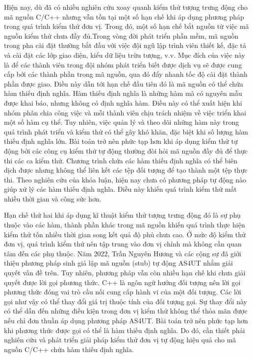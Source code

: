 Hiện nay, dù đã có nhiều nghiên cứu xoay quanh kiểm thử tượng trưng động cho mã nguồn C/C++ nhưng vẫn tồn tại một số hạn chế khi áp dụng phương pháp trong quá trình kiểm thử đơn vị. Trong đó, một số hạn chế bắt nguồn từ việc mã nguồn kiểm thử chưa đầy đủ.Trong vòng đời phát triển phần mềm, mã nguồn trong pha cài đặt thường bắt đầu với việc đội ngũ lập trình viên thiết kế, đặc tả và cài đặt các lớp giao diện, kiểu dữ liệu trừu tượng, v.v. Mục đích của việc này là để các thành viên trong đội nhóm phát triển biết được dịch vụ sẽ được cung cấp bởi các thành phần trong mã nguồn, qua đó đẩy nhanh tốc độ cài đặt thành phần được giao. Điều này dẫn tới hạn chế đầu tiên đó là mã nguồn có thể chứa hàm thiếu định nghĩa. Hàm thiếu định nghĩa là những hàm mà có nguyên mẫu được khai báo, nhưng không có định nghĩa hàm. Điều này có thể xuất hiện khi nhóm phân chia công việc và mỗi thành viên chịu trách nhiệm về việc triển khai một số hàm cụ thể. Tuy nhiên, việc quản lý và theo dõi những hàm này trong quá trình phát triển và kiểm thử có thể gây khó khăn, đặc biệt khi số lượng hàm thiếu định nghĩa lớn. Bài toán trở nên phức tạp hơn khi áp dụng kiểm thử tự động bởi các công cụ kiểm thử tự động thường đòi hỏi mã nguồn đầy đủ để thực thi các ca kiểm thử. Chương trình chứa các hàm thiếu định nghĩa có thể biên dịch được nhưng không thể liên kết các tệp đối tượng để tạo thành một tệp thực thi. Theo nghiên cứu của khóa luận, hiện nay chưa có phương pháp tự động nào giúp xử lý các hàm thiếu định nghĩa. Điều này khiến quá trình kiểm thử mất nhiều thời gian và công sức hơn. 

Hạn chế thứ hai khi áp dụng kĩ thuật kiểm thử tượng trưng động đó là sự phụ thuộc vào các hàm, thành phần khác trong mã nguồn khiến quá trình thực hiện kiểm thử tốn nhiều thời gian song kết quả độ phủ chưa cao. Ở mức độ kiểm thử đơn vị, quá trình kiểm thử nên tập trung vào đơn vị chính mà không cần quan tâm đến các phụ thuộc. Năm 2022, Trần Nguyên Hương và các cộng sự đã giới thiệu phương pháp sinh giả lập mã nguồn (stub) tự động AS4UT \cite{TUNG2022106821} nhằm giải quyết vấn đề trên. Tuy nhiên, phương pháp vẫn còn nhiều hạn chế khi chưa giải quyết được lời gọi phương thức. C++ là ngôn ngữ hướng đối tượng nên lời gọi phương thức đóng vai trò cầu nối cung cấp hành vi của một đối tượng. Các lời gọi như vậy có thể thay đổi giá trị thuộc tính của đối tượng gọi. Sự thay đổi này có thể dẫn đến những điều kiện trong đơn vị kiểm thử không thể thỏa mãn được nếu chỉ đơn thuần áp dụng phương pháp AS4UT. Bài toán trở nên phức tạp hơn khi phương thức được gọi có thể là hàm thiếu định nghĩa. Do đó, cần thiết phải nghiên cứu và phát triển giải pháp kiểm thử đơn vị tự động hiệu quả cho mã nguồn C/C++ chứa hàm thiếu định nghĩa. 

